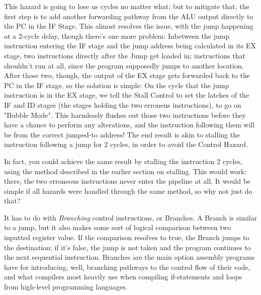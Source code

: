 \documentclass[12pt,twoside]{reedthesis}
\begin{document}
This hazard is going to lose us cycles no matter what; but to mitigate that, the first step is to add another forwarding pathway from the ALU output directly to the PC in the IF Stage. This almost resolves the issue, with the jump happening at a 2-cycle delay, though there's one more problem: Inbetween the  jump instruction entering the IF stage and the jump address being calculated in its EX stage, two instructions directly after the Jump get loaded in; instructions that shouldn't run at all, since the program supposedly jumps to another location. After those two, though, the output of the EX stage gets forwarded back to the PC in the IF stage, so the solution is simple: On the cycle that the jump instruction is in the EX stage, we tell the Stall Control to set the latches of the IF and ID stages (the stages holding the two erroneus instructions), to go on "Bubble Mode". This harmlessly flushes out those two instructions before they have a chance to perform any alterations, and the instruction following them will be from the correct jumped-to address! The end result is akin to stalling the instruction following a jump for 2 cycles, in order to avoid the Control Hazard.

In fact, you could achieve the same result by stalling the instruction 2 cycles, using the method described in the earlier section on stalling. This would work: there, the two erroneous instructions never enter the pipeline at all. It would be simple if all hazards were handled through the same method, so why not just do that?

It has to do with \textit{Branching} control instructions, or Branches. A Branch is similar to a jump, but it also makes some sort of logical comparison between two inputted register value. If the comparison resolves to true, the Branch jumps to the destination; if it's false, the jump is not taken and the program continues to the next sequential instruction. Branches are the main option assembly programs have for introducing, well, branching pathways to the control flow of their code, and what compilers most heavily use when compiling if-statements and loops from high-level programming languages.
\end{document}
